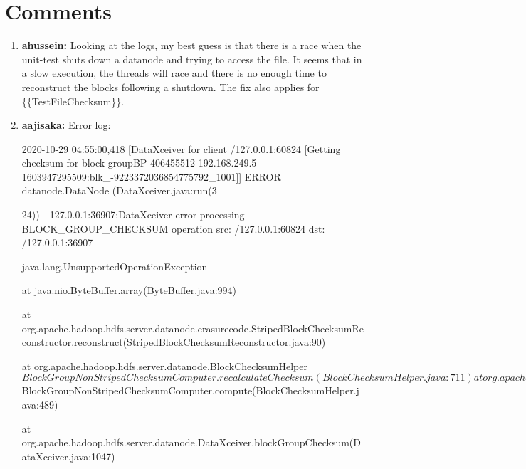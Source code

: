 \documentclass{report}%
\begin{document}
%
\section{Comments}%
\label{sec:Comments}%
\begin{enumerate}%
\item%
\textbf{ahussein: }Looking at the logs, my best guess is that there is a race when the unit{-}test shuts down a datanode and trying to access the file.\newline%
\newline%
\newline%
\newline%
It seems that in a slow execution, the threads will race and there is no enough time to reconstruct the blocks following a shutdown.\newline%
\newline%
\newline%
\newline%
The fix also applies for \{\{TestFileChecksum\}\}.%
\item%
\textbf{aajisaka: }\newline%
\newline%
Error log:\newline%
\newline%
\begin{spverbatim}

2020-10-29 04:55:00,418 [DataXceiver for client /127.0.0.1:60824 [Getting checksum for block groupBP-406455512-192.168.249.5-1603947295509:blk_-9223372036854775792_1001]] ERROR datanode.DataNode (DataXceiver.java:run(3

24)) - 127.0.0.1:36907:DataXceiver error processing BLOCK_GROUP_CHECKSUM operation src: /127.0.0.1:60824 dst: /127.0.0.1:36907

java.lang.UnsupportedOperationException

    at java.nio.ByteBuffer.array(ByteBuffer.java:994)

    at org.apache.hadoop.hdfs.server.datanode.erasurecode.StripedBlockChecksumReconstructor.reconstruct(StripedBlockChecksumReconstructor.java:90)

    at org.apache.hadoop.hdfs.server.datanode.BlockChecksumHelper$BlockGroupNonStripedChecksumComputer.recalculateChecksum(BlockChecksumHelper.java:711)

    at org.apache.hadoop.hdfs.server.datanode.BlockChecksumHelper$BlockGroupNonStripedChecksumComputer.compute(BlockChecksumHelper.java:489)

    at org.apache.hadoop.hdfs.server.datanode.DataXceiver.blockGroupChecksum(DataXceiver.java:1047)


\end{spverbatim}
\end{enumerate}
\end{document}

